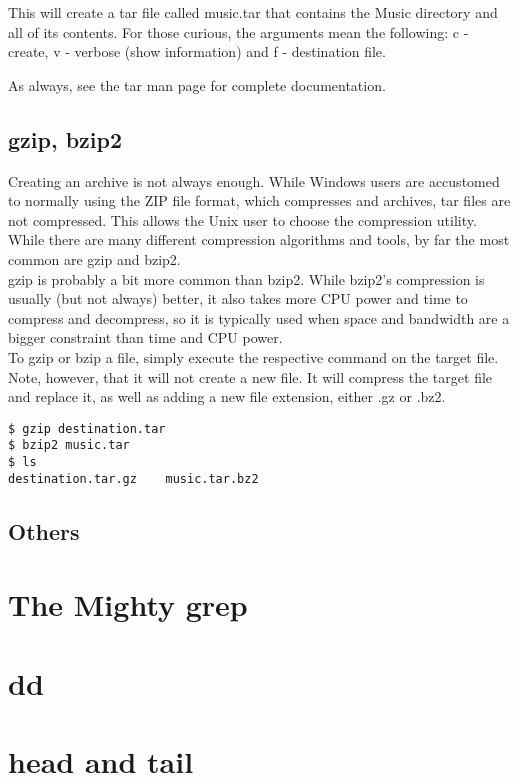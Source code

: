 This will create a tar file called music.tar that contains the Music directory and all of its contents.  For those curious, the arguments mean the following: c - create, v - verbose (show information) and f - destination file.

As always, see the tar man page for complete documentation.

\subsection{gzip, bzip2}

Creating an archive is not always enough.  While Windows users are accustomed to normally using the ZIP file format, which compresses and archives, tar files are not compressed.  This allows the Unix user to choose the compression utility.  While there are many different compression algorithms and tools, by far the most common are gzip and bzip2.\\

gzip is probably a bit more common than bzip2.  While bzip2's compression is usually (but not always) better, it also takes more CPU power and time to compress and decompress, so it is typically used when space and bandwidth are a bigger constraint than time and CPU power.\\

To gzip or bzip a file, simply execute the respective command on the target file.  Note, however, that it will not create a new file. It will compress the target file and replace it, as well as adding a new file extension, either .gz or .bz2.\\

\begin{verbatim}
$ gzip destination.tar
$ bzip2 music.tar
$ ls 
destination.tar.gz    music.tar.bz2
\end{verbatim}

\subsection{Others}

\section{The Mighty grep}

\section{dd}

\section{head and tail}

